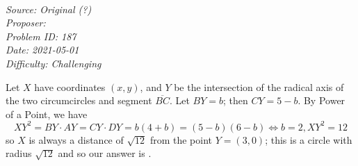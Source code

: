 \SSbreak\\
\emph{Source: Original (?)}\\
\emph{Proposer: \Pchris}\\ %
\emph{Problem ID: 187}\\
\emph{Date: 2021-05-01}\\
\emph{Difficulty: Challenging}\\
\SSbreak
 
\bigskip

\begin{solution}\hfil\medskip
	
    Let $X$ have coordinates $(x, y)$, and $Y$ be the intersection of the radical axis of the two circumcircles and segment $\overline{BC}$.
    Let $BY = b$; then $CY = 5 - b$. By Power of a Point, we have $$XY^2 = BY \cdot AY = CY \cdot DY = b(4 + b) = (5 - b)(6 - b) \iff b = 2, XY^2 = 12$$
    so $X$ is always a distance of $\sqrt{12}$ from the point $Y = (3, 0)$; this is a circle with radius $\sqrt{12}$ and so our answer is .
\end{solution}\bigskip
